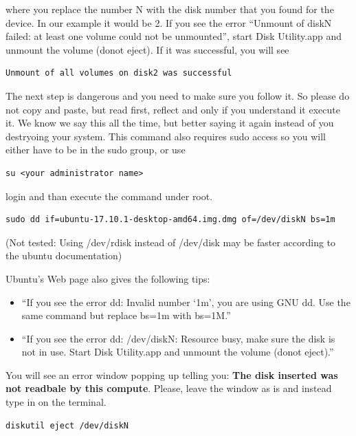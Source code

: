 where you replace the number N with the disk number that you found for
the device. In our example it would be 2. If you see the error ``Unmount
of diskN failed: at least one volume could not be unmounted'', start
Disk Utility.app and unmount the volume (donot eject). If it was
successful, you will see

\begin{lstlisting}
Unmount of all volumes on disk2 was successful
\end{lstlisting}

The next step is dangerous and you need to make sure you follow it. So
please do not copy and paste, but read first, reflect and only if you
understand it execute it. We know we say this all the time, but better
saying it again instead of you destryoing your system. This command also
requires sudo access so you will either have to be in the sudo group, or
use

\begin{lstlisting}
su <your administrator name>
\end{lstlisting}

login and than execute the command under root.

\begin{lstlisting}
sudo dd if=ubuntu-17.10.1-desktop-amd64.img.dmg of=/dev/diskN bs=1m
\end{lstlisting}

(Not tested: Using /dev/rdisk instead of /dev/disk may be faster
according to the ubuntu documentation)

Ubuntu's Web page also gives the following tips:

\begin{itemize}
\item
  ``If you see the error dd: Invalid number `1m', you are using GNU dd.
  Use the same command but replace bs=1m with bs=1M.''
\item
  ``If you see the error dd: /dev/diskN: Resource busy, make sure the
  disk is not in use. Start Disk Utility.app and unmount the volume
  (donot eject).''
\end{itemize}

You will see an error window popping up telling you: \textbf{The disk
inserted was not readbale by this compute}. Please, leave the window as
is and instead type in on the terminal.

\begin{lstlisting}
diskutil eject /dev/diskN
\end{lstlisting}

